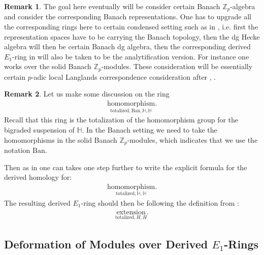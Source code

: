 \documentclass[12pt]{article}
\theoremstyle{definition}
\newtheorem{remark}{Remark}
\begin{document}
\begin{remark}
The goal here eventually will be consider certain Banach $\mathbb{Z}_p$-algebra and consider the corresponding Banach representations. One has to upgrade all the corresponding rings here to certain condensed setting such as in \cite{HM}, i.e. first the representation spaces have to be carrying the Banach topology, then the dg Hecke algebra will then be certain Banach dg algebra, then the corresponding derived $E_1$-ring in \cite{Sa} will also be taken to be the analytification version. For instance one works over the solid Banach $\mathbb{Z}_p$-modules. These consideration will be essentially certain $p$-adic local Langlands correspondence consideration after \cite{L1}, \cite{C}. 
\end{remark}



\begin{remark}
\indent Let us make some discussion on the ring
\begin{align}
\underset{{\mathrm{totalized},\mathrm{Ban},\mathbb{H},\mathbb{H}}}{\mathrm{homomorphism}}.
\end{align}
Recall that this ring is the totalization of the homomorphism group for the bigraded suspension of $\mathbb{H}$. In the Banach setting we need to take the homomorphisms in the solid Banach $\mathbb{Z}_p$-modules, which indicates that we use the notation $\mathrm{Ban}$.
\end{remark}

\indent Then as in \cite[Theorem 1.1]{So1} one can takes one step further to write the explicit formula for the derived homology for:
\begin{align}
\underset{{\mathrm{totalized},\mathbb{H},\mathbb{H}}}{\mathrm{homomorphism}}.
\end{align}
The resulting derived $E_1$-ring should then be following the definition from \cite{Sa}:
\begin{align}
\underset{{\mathrm{totalized},H,H}}{\mathrm{extension}}.
\end{align}



\subsection{Deformation of Modules over Derived $E_1$-Rings}
\end{document}
